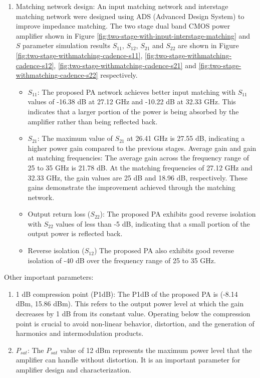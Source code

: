 \begin{enumerate}
\item Matching network design:
    An input matching network and interstage matching network were designed using ADS (Advanced Design System) to improve impedance matching.
    The two stage dual band CMOS power amplifier shown in Figure \ref{fig:two-stage-with-input-interstage-matching} and $S$ parameter simulation results $S_{11}$, $S_{12}$, $S_{21}$ and $S_{22}$ are shown in Figure \ref{fig:two-stage-withmatching-cadence-s11}, \ref{fig:two-stage-withmatching-cadence-s12}, \ref{fig:two-stage-withmatching-cadence-s21} and \ref{fig:two-stage-withmatching-cadence-s22} respectively.
    \begin{itemize}
        \item $S_{11}$: The proposed PA network achieves better input matching with $S_{11}$ values of -16.38 dB at 27.12 GHz and -10.22 dB at 32.33 GHz. This indicates that a larger portion of the power is being absorbed by the amplifier rather than being reflected back.
        \item $S_{21}$: The maximum value of $S_{21}$ at 26.41 GHz is 27.55 dB, indicating a higher power gain compared to the previous stages.
        Average gain and gain at matching frequencies: The average gain across the frequency range of  25 to 35 GHz is 21.78 dB. At the matching frequencies of 27.12 GHz and 32.33 GHz, the gain values are 25 dB and 18.96 dB, respectively. These gains demonstrate the improvement achieved through the matching network.
        \item Output return loss ($S_{22}$): The proposed PA exhibits good reverse isolation with $S_{22}$ values of less than -5 dB, indicating that a small portion of the output power is reflected back.
        \item Reverse isolation ($S_{12}$) The proposed PA also exhibits good reverse isolation of -40 dB over the frequency range of 25 to 35 GHz.
    \end{itemize}
\end{enumerate}
Other important parameters:
\begin{enumerate}
\item 1 dB compression point (P1dB):
        The P1dB of the proposed PA is (-8.14 dBm, 15.86 dBm). This refers to the output power level at which the gain decreases by 1 dB from its constant value.
        Operating below the compression point is crucial to avoid non-linear behavior, distortion, and the generation of harmonics and intermodulation products.

\item $P_{sat}$:
        The $P_{sat}$ value of 12 dBm represents the maximum power level that the amplifier can handle without distortion.
        It is an important parameter for amplifier design and characterization.
\end{enumerate}

